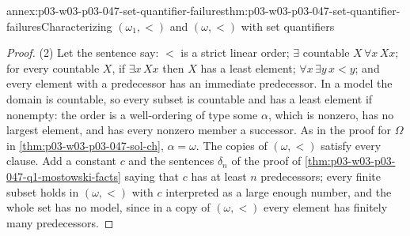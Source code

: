 \begin{annexitem}{annex:p03-w03-p03-047-set-quantifier-failures}{thm:p03-w03-p03-047-set-quantifier-failures}{Characterizing \((\omega_1,<)\) and \((\omega,<)\) with set quantifiers}
\begin{proof}
(2) Let the sentence say: \(<\) is a strict linear order;
\(\exists\) countable \(X\,\forall x\,Xx\); for every countable \(X\), if
\(\exists x\,Xx\) then \(X\) has a least element; \(\forall x\,\exists y\,x<y\);
and every element with a predecessor has an immediate predecessor.  In a
model the domain is countable, so every subset is countable and has a least
element if nonempty: the order is a well-ordering of type some \(\alpha\),
which is nonzero, has no largest element, and has every nonzero member a
successor.  As in the proof for \(\Omega\) in
\cref{thm:p03-w03-p03-047-sol-ch}, \(\alpha=\omega\).  The copies of
\((\omega,<)\) satisfy every clause.  Add a constant \(c\) and the sentences
\(\delta_n\) of the proof of \cref{thm:p03-w03-p03-047-q1-mostowski-facts}
saying that \(c\) has at least \(n\) predecessors; every finite subset holds
in \((\omega,<)\) with \(c\) interpreted as a large enough number, and the whole
set has no model, since in a copy of \((\omega,<)\) every element has
finitely many predecessors.
\end{proof}
\end{annexitem}

